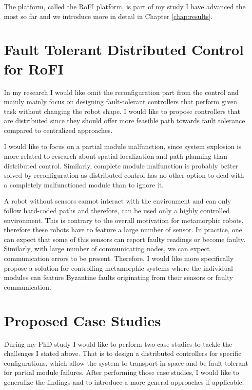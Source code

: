 The platform, called the RoFI platform, is part of my study I have advanced the
most so far and we introduce more in detail in Chapter \ref{chap:results}.

\section{Fault Tolerant Distributed Control for RoFI}

In my research I would like omit the reconfiguration part from the control and
mainly mainly focus on designing fault-tolerant controllers that perform given
task without changing the robot shape. I would like to propose controllers that
are distributed since they should offer more feasible path towards fault
tolerance compared to centralized approaches.

I would like to focus on a partial module malfunction, since
system explosion is more related to research about spatial localization and path
planning than distributed control. Similarly, complete module malfunction is
probably better solved by reconfiguration as distributed control has no other
option to deal with a completely malfunctioned module than to ignore it.

A robot without sensors cannot interact with the environment and can only follow
hard-coded paths and therefore, can be used only a highly controlled
environment. This is contrary to the overall motivation for metamorphic robots,
therefore these robots have to feature a large number of sensor. In practice,
one can expect that some of this sensors can report faulty readings or become
faulty. Similarly, with large number of communicating nodes, we can expect
communication errors to be present. Therefore, I would like more specifically
propose a solution for controlling metamorphic systems where the individual
modules can feature Byzantine faults originating from their sensors or faulty
communication.

\section{Proposed Case Studies}

During my PhD study I would like to perform two case studies to tackle the
challenges I stated above. That is to design a distributed controllers for
specific configurations, which allow the system to transport in space and be
fault tolerant for partial module failures. After performing those case
studies, I would like to generalize the findings and to introduce a more general
approaches if applicable.

